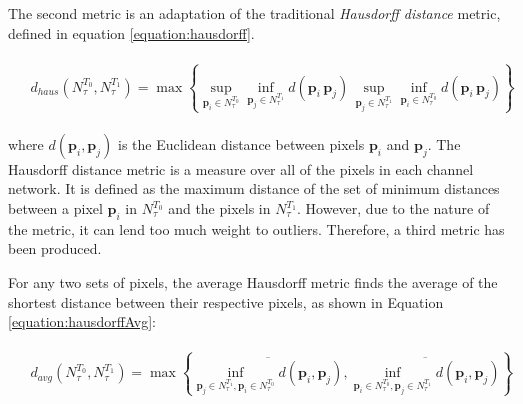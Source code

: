 
The second metric is an adaptation of the traditional \emph{Hausdorff distance} metric, defined in equation \ref{equation:hausdorff}.

\begin{align}
\begin{split}
\label{equation:hausdorff}
& d_{haus} \left( N^{T_{0}}_{\tau}, N^{T_{1}}_{\tau} \right) =  
\max \left\{ \sup_{ \textbf{p}_{i} \in N^{T_{0}}_{\tau} } \inf_{ \textbf{p}_{j} \in N^{T_{1}}_{\tau} } d\left( \textbf{p}_{i} \, \textbf{p}_{j} \right) \, \sup_{ \textbf{p}_{j} \in N^{T_{1}}_{\tau} } \inf_{ \textbf{p}_{i} \in N^{T_{0}}_{\tau} } d\left( \textbf{p}_{i} \, \textbf{p}_{j} \right) \right\}
\end{split}
\end{align}

\noindent where $d\left( \textbf{p}_{i}, \textbf{p}_{j} \right) $ is
the Euclidean distance between pixels $\textbf{p}_{i}$ and
$\textbf{p}_{j}$. The Hausdorff distance metric is a measure over all of the pixels in each channel network. It is defined as the maximum distance  of the set of minimum distances between a pixel $\textbf{p}_{i}$ in $N^{T_{0}}_{\tau}$ and the pixels in $N^{T_{1}}_{\tau}$. However, due to the nature of the metric, it can lend too much weight to outliers. Therefore, a third metric has been produced.

For any two sets of pixels, the average Hausdorff metric finds the average of the shortest distance between their respective pixels, as shown in Equation \ref{equation:hausdorffAvg}:

\begin{align}
\label{equation:hausdorffAvg}
\begin{split}
& d_{avg} \left( N^{T_{0}}_{\tau}, N^{T_{1}}_{\tau} \right) = 
 \max\left\{ \overline{\inf_{\textbf{p}_{j} \in N^{T_{1}}_{\tau}, \textbf{p}_{i} \in N^{T_{0}}_{\tau}} d\left(\textbf{p}_{i}, \textbf{p}_{j}\right)}, \overline{\inf_{\textbf{p}_{i} \in N^{T_{0}}_{\tau}, \textbf{p}_{j} \in N^{T_{1}}_{\tau}} d\left( \textbf{p}_{i}, \textbf{p}_{j} \right)} \right\}
\end{split}
\end{align}

